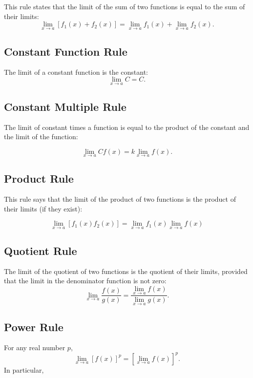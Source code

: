 \documentclass[
]{book}
\begin{document}
This rule states that the limit of the sum of two functions is equal to the sum of their limits:
\[
\lim_{x\to a}[f_1(x) + f_2(x) ] = \lim_{x\to a}f_1(x) + \lim_{x\to a}f_2(x).
\]

\hypertarget{constant-function-rule-1}{%
\subsection{Constant Function Rule}\label{constant-function-rule-1}}

The limit of a constant function is the constant: \[\lim_{x\to a} C = C.\]

\hypertarget{constant-multiple-rule-1}{%
\subsection{Constant Multiple Rule}\label{constant-multiple-rule-1}}

The limit of constant times a function is equal to the product of the constant and the limit of the function:

\[
\lim_{x\to a}Cf(x) = k\lim_{x\to a}f(x).
\]

\hypertarget{product-rule-1}{%
\subsection{Product Rule}\label{product-rule-1}}

This rule says that the limit of the product of two functions is the product of their limits (if they exist):

\[
\lim_{x\to a}[f_1(x)f_2(x)] = \lim_{x\to a}f_1(x)\lim_{x\to a}f(x)
\]

\hypertarget{quotient-rule-1}{%
\subsection{Quotient Rule}\label{quotient-rule-1}}

The limit of the quotient of two functions is the quotient of their limits, provided that the limit in the denominator function is not zero:
\[
\lim_{x\to a}\frac{f(x)}{g(x)} = \frac{\lim_{x\to a}f(x)}{\lim_{x\to a}g(x)}.
\]

\hypertarget{power-rule-1}{%
\subsection{Power Rule}\label{power-rule-1}}

For any real number \(p\),
\[
\lim_{x\to a}[f(x)]^p = [\lim_{x\to a}f(x)]^p.
\]
In particular,
\end{document}
